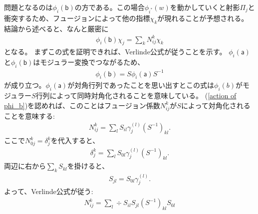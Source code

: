 \documentclass{jlreq}
\begin{document}
問題となるのは$ϕ_i(𝖻)$の方である。この場合$ϕ_{i^*}(w)$を動かしていくと射影$Π_j$と衝突するため、フュージョンによって他の指標$χ_k$が現れることが予想される。
結論から述べると、なんと厳密に
\begin{align}
    ϕ_i(𝖻)χ_j = ∑_k N_{ij}^k χ_k
    \label{action of phi_b}
\end{align}
となる。
まずこの式を証明できれば、Verlinde公式が従うことを示す。
$ϕ_i(𝖺)$と$ϕ_i(𝖻)$はモジュラー変換でつながるため、
\begin{align}
    ϕ_i(𝖻) = Sϕ_i(𝖺)S^{-1}
\end{align}
が成り立つ。$ϕ_i(𝖺)$が対角行列であったことを思い出すとこの式は$ϕ_i(b)$がモジュラー$S$行列によって同時対角化されることを意味している。
(\ref{action of phi_b})を認めれば、このことはフュージョン係数$N_{ij}^k$が$S$によって対角化されることを意味する:
\begin{align}
    N_{ij}^k = ∑_l S_{il}γ_j^{(l)}(S^{-1})_{kl}.
\end{align}
ここで$N_{0j}^k = δ_j^k$を代入すると、
\begin{align}
    δ_j^k = ∑_l S_{0l}γ_j^{(l)}(S^{-1})_{kl}.
\end{align}
両辺に右から$∑_k S_{kl}$を掛けると、
\begin{align}
    S_{jl} = S_{0l}γ_j^{(l)}.
\end{align}
よって、Verlinde公式が従う:
\begin{align}
    N_{ij}^k = ∑_l ÷{S_{il}S_{jl}(S^{-1})_{kl}}{S_{0l}}
\end{align}
\end{document}
